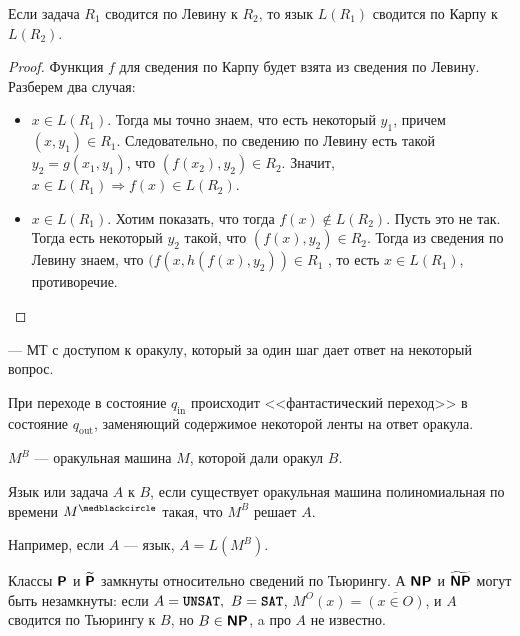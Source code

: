 		\begin{st}
	    Если задача $ R_1$ сводится по Левину к $ R_2$, то язык $ L(R_1)$ сводится по Карпу к $ L(R_2)$.
        \end{st}
        \begin{proof}
	    Функция $ f$ для сведения по Карпу будет взята из сведения по Левину. Разберем два случая:
	    \begin{itemize}
		    \item $ x \in L(R_1)$. Тогда мы точно знаем, что есть некоторый $ y_1$, причем $ (x, y_1) \in  R_1$. 
			    Следовательно, по сведению по Левину есть такой $ y_2 = g(x_1, y_1)$, что $ (f(x_2), y_2) \in R_2$. 
			    Значит, $x \in L(R_1) \Longrightarrow  f(x) \in L(R_2)$.
	        \item $x \in L(R_1)$. Хотим показать, что тогда $ f(x) \notin L(R_2)$. Пусть это не так.
	            Тогда есть некоторый $ y_2$ такой, что $ (f(x), y_2) \in R_2$. 
	            Тогда из сведения по Левину знаем, что $(f(x, h(f(x), y_2)) \in  R_1$ , то есть $x \in  L(R_1)$, противоречие.
	    \end{itemize}
\end{proof}

\begin{defn}[Оракульная МТ]
	 --- МТ с доступом к оракулу, который за один шаг дает ответ на некоторый вопрос.
\end{defn}
\begin{name}
	При переходе в состояние $ q_{\text{in}}$ происходит <<фантастический переход>> в состояние $ q_{\text{out}}$, заменяющий содержимое некоторой ленты на ответ оракула.

	\noindent$ M^{B}$ --- оракульная машина $ M$, которой дали оракул $ B$. 
\end{name}

\begin{defn}
	Язык или задача $ A$  к $ B$, если существует оракульная машина полиномиальная по времени $ M^{\medblackcircle}$ такая, что $ M^{B}$ решает $ A$.

	\noindent
	Например, если  $ A$ ---  язык, $ A = L(M^{B})$.
\end{defn}
\begin{ex}
	Классы $\P$ и $\tP$ замкнуты относительно сведений по Тьюрингу. А $\NP$ и $\tNP$ могут быть незамкнуты: если $A = \UNSAT,~ B = \SAT$, $ M^{O}(x) = \overline{(x \in O)}$, и $ A$ сводится по Тьюрингу к $ B$, но $ B \in \NP$, a про $ A$ не известно.
\end{ex}

